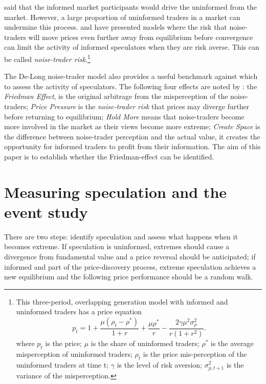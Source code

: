 \documentclass[preprint,12pt,authoryear]{elsarticle}
\begin{document}
\citet{FriedmanPositive} said that the informed market participants would drive the uninformed from the market.  However, a large proportion of uninformed traders in a market can undermine this process.  \citet{Delong1990noise} and \citet{shleifer1997limits} have presented models where the risk that noise-traders will move prices even further away from equilibrium before convergence can limit the activity of informed speculators when they are risk averse. This can be called \emph{noise-trader risk}.\footnote{This three-period, overlapping generation model with informed and uninformed traders has a price equation \begin{equation}
p_t = 1 + \frac{\mu(\rho_t - \rho^*)}{1 + r} + \frac{ \mu \rho^*}{r} - \frac{2 \gamma \mu^2 \sigma_{\rho}^2}{r(1 + r^2)}.
\label{eq:NP2}
\end{equation} 
 where $p_t$ is the price; $\mu$ is the share of uninformed traders; $\rho^*$ is the average misperception of uninformed traders; $\rho_t$ is the price mis-perception of the uninformed traders at time t; $\gamma$ is the level of risk aversion; $\sigma^2_{p,t+1}$ is the variance of the misperception.}   

  The De-Long noise-trader model also provides a useful benchmark against which to assess the activity of speculators. The following four effects are noted by \citet[pp. 14-15]{Delong1990noise}:  the \emph{Friedman Effect}, is the original arbitrage from the misperception of the noise-traders; \emph{Price Pressure} is the \emph{noise-trader risk} that prices may diverge further before returning to equilibrium; \emph{Hold More} means that noise-traders become more involved in the market as their views become more extreme; \emph{Create Space} is the difference between noise-trader perception and the actual value, it creates the opportunity for informed traders to profit from their information. The aim of this paper is to establish whether the Friedman-effect can be identified.

\section{Measuring speculation and the event study}
There are two steps: identify speculation and assess what happens when it becomes extreme.  If speculation is uninformed, extremes should cause a divergence from fundamental value and a price reversal should be anticipated; if informed and part of the price-discovery process, extreme speculation achieves a new equilibrium and the following price performance should be a random walk.  
\end{document}
